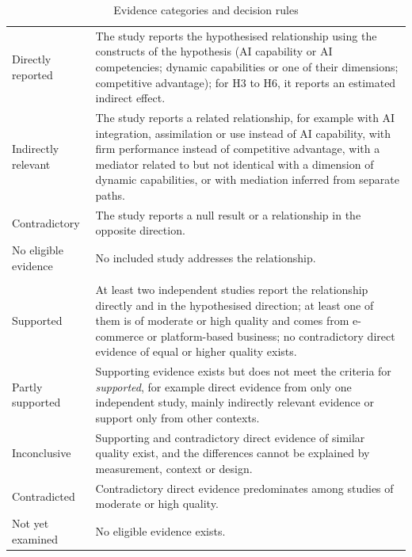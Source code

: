 \begin{table}[htbp]
\centering
\caption{Evidence categories and decision rules}
\label{tab:rules}
\footnotesize
\renewcommand{\arraystretch}{1.1}\setlength{\tabcolsep}{4pt}
\begin{tabularx}{\textwidth}{|>{\raggedright\arraybackslash}p{2.8cm}|>{\raggedright\arraybackslash}X|}
\hline
\multicolumn{2}{|l|}{\textbf{Panel A: Study-level evidence categories}} \\
\hline
Directly reported & The study reports the hypothesised relationship using the constructs of the hypothesis (AI capability or AI competencies; dynamic capabilities or one of their dimensions; competitive advantage); for H3 to H6, it reports an estimated indirect effect. \\ \hline
Indirectly relevant & The study reports a related relationship, for example with AI integration, assimilation or use instead of AI capability, with firm performance instead of competitive advantage, with a mediator related to but not identical with a dimension of dynamic capabilities, or with mediation inferred from separate paths. \\ \hline
Contradictory & The study reports a null result or a relationship in the opposite direction. \\ \hline
No eligible evidence & No included study addresses the relationship. \\
\hline
\multicolumn{2}{|l|}{\textbf{Panel B: Hypothesis-level judgements}} \\
\hline
Supported & At least two independent studies report the relationship directly and in the hypothesised direction; at least one of them is of moderate or high quality and comes from e-commerce or platform-based business; no contradictory direct evidence of equal or higher quality exists. \\ \hline
Partly supported & Supporting evidence exists but does not meet the criteria for \textit{supported}, for example direct evidence from only one independent study, mainly indirectly relevant evidence or support only from other contexts. \\ \hline
Inconclusive & Supporting and contradictory direct evidence of similar quality exist, and the differences cannot be explained by measurement, context or design. \\ \hline
Contradicted & Contradictory direct evidence predominates among studies of moderate or high quality. \\ \hline
Not yet examined & No eligible evidence exists. \\

\end{tabularx}
\end{table}
